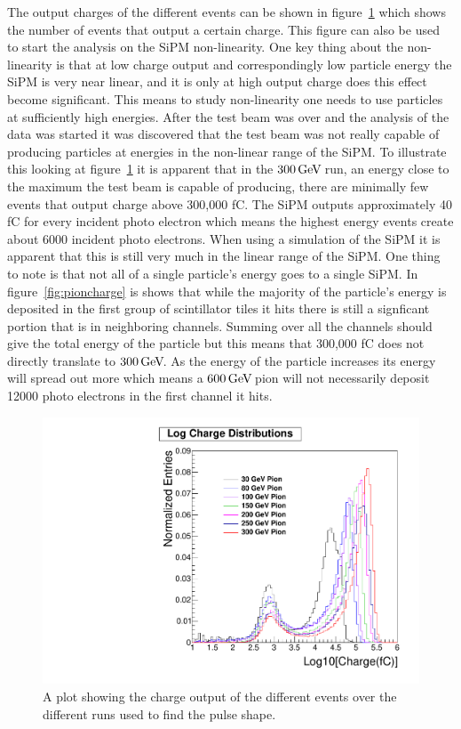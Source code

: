 The output charges of the different events can be shown in figure~\ref{fig:Log} which shows the number of events that output a certain charge. This figure can also be used to start the analysis on the SiPM non-linearity. One key thing about the non-linearity is that at low charge output and correspondingly low particle energy the SiPM is very near linear, and it is only at high output charge does this effect become significant. This means to study non-linearity one needs to use particles at sufficiently high energies. After the test beam was over and the analysis of the data was started it was discovered that the test beam was not really capable of producing particles at energies in the non-linear range of the SiPM. To illustrate this looking at figure~\ref{fig:Log} it is apparent that in the $300{\,\text{Ge\hspace{-.08em}V\hspace{-0.16em}}}$ run, an energy close to the maximum the test beam is capable of producing, there are minimally few events that output charge above 300,000 fC. The SiPM outputs approximately 40 fC for every incident photo electron which means the highest energy events create about 6000 incident photo electrons. When using a simulation of the SiPM it is apparent that this is still very much in the linear range of the SiPM. One thing to note is that not all of a single particle's energy goes to a single SiPM. In figure~\ref{fig:pioncharge} is shows that while the majority of the particle's energy is deposited in the first group of scintillator tiles it hits there is still a signficant portion that is in neighboring channels. Summing over all the channels should give the total energy of the particle but this means that 300,000 fC does not directly translate to $300{\,\text{Ge\hspace{-.08em}V\hspace{-0.16em}}}$. As the energy of the particle increases its energy will spread out more which means a $600{\,\text{Ge\hspace{-.08em}V\hspace{-0.16em}}}$ pion will not necessarily deposit 12000 photo electrons in the first channel it hits.

\begin{figure}
\centering
\includegraphics[width=0.7\linewidth]{Figures/Logplot.pdf}
\caption{A plot showing the charge output of the different events over the different runs used to find the pulse shape.}
\label{fig:Log}
\end{figure}

